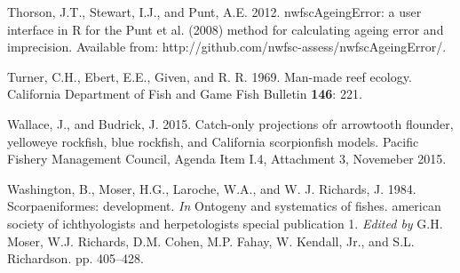 \documentclass[12pt,]{article}
\begin{document}
\hypertarget{ref-Thorson2012}{}
Thorson, J.T., Stewart, I.J., and Punt, A.E. 2012. nwfscAgeingError: a
user interface in R for the Punt et al. (2008) method for calculating
ageing error and imprecision. Available from:
http://github.com/nwfsc-assess/nwfscAgeingError/.

\hypertarget{ref-Turner1969}{}
Turner, C.H., Ebert, E.E., Given, and R. R. 1969. Man-made reef ecology.
California Department of Fish and Game Fish Bulletin \textbf{146}: 221.

\hypertarget{ref-Wallace2015}{}
Wallace, J., and Budrick, J. 2015. Catch-only projections ofr arrowtooth
flounder, yelloweye rockfish, blue rockfish, and California scorpionfish
models. Pacific Fishery Management Council, Agenda Item I.4, Attachment
3, Novemeber 2015.

\hypertarget{ref-Washington1984}{}
Washington, B., Moser, H.G., Laroche, W.A., and W. J. Richards, J. 1984.
Scorpaeniformes: development. \emph{In} Ontogeny and systematics of
fishes. american society of ichthyologists and herpetologists special
publication 1. \emph{Edited by} G.H. Moser, W.J. Richards, D.M. Cohen,
M.P. Fahay, W. Kendall, Jr., and S.L. Richardson. pp. 405--428.
\end{document}
